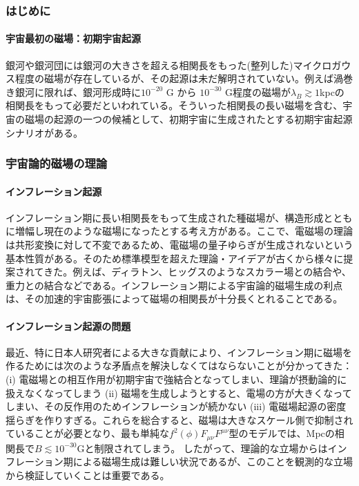 \subsubsection{はじめに}
\label{c06.s1.ss7.sss1}

\paragraph{宇宙最初の磁場：初期宇宙起源}

銀河や銀河団には銀河の大きさを超える相関長をもった(整列した)マイクロガウス程度の磁場が存在しているが、その起源は未だ解明されていない。例えば渦巻き銀河に限れば、銀河形成時に$10^{-20}$ G から $10^{-30}$ G程度の磁場が$\lambda_B\gtrsim 1$kpcの相関長をもって必要だといわれている\citep{1999PhRvD..60b1301D}。そういった相関長の長い磁場を含む、宇宙の磁場の起源の一つの候補として、初期宇宙に生成されたとする初期宇宙起源シナリオがある。

\subsubsection{宇宙論的磁場の理論}
\label{c06.s1.ss7.sss2}

\paragraph{インフレーション起源}

インフレーション期に長い相関長をもって生成された種磁場が、構造形成とともに増幅し現在のような磁場になったとする考え方がある。ここで、電磁場の理論は共形変換に対して不変であるため、電磁場の量子ゆらぎが生成されないという基本性質がある。そのため標準模型を超えた理論・アイデアが古くから様々に提案されてきた。例えば、ディラトン\citep{1992ApJ...391L...1R,2004PhRvD..69d3507B}、ヒッグス\citep{2004PhRvD..70d3004P}のようなスカラー場との結合や、重力との結合\citep{1988PhRvD..37.2743T}などである。インフレーション期による宇宙論的磁場生成の利点は、その加速的宇宙膨張によって磁場の相関長が十分長くとれることである。

\paragraph{インフレーション起源の問題}

最近、特に日本人研究者による大きな貢献により、インフレーション期に磁場を作るためには次のような矛盾点を解決しなくてはならないことが分かってきた：(i) 電磁場との相互作用が初期宇宙で強結合となってしまい、理論が摂動論的に扱えなくなってしまう\citep{2009JCAP...08..025D} (ii) 磁場を生成しようとすると、電場の方が大きくなってしまい、その反作用のためインフレーションが続かない\citep{2009JCAP...12..009K} (iii) 電磁場起源の密度揺らぎを作りすぎる\citep{2012PhRvD..86b3512S,2014JCAP...03..013F}。これらを総合すると、磁場は大きなスケール側で抑制されていることが必要となり、最も単純な$f^2(\phi)F_{\mu\nu}F^{\mu\nu}$型のモデルでは、Mpcの相関長で$B\lesssim10^{-30}$Gと制限されてしまう\citep{2014JCAP...06..053F}。 したがって、理論的な立場からはインフレーション期による磁場生成は難しい状況であるが、このことを観測的な立場から検証していくことは重要である。


